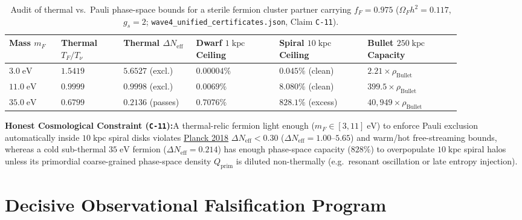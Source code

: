 \documentclass[11pt,letterpaper]{article}
\newcommand{\cautionbox}[2]{%
  \vspace{5pt}\noindent\colorbox{warnbg}{%
    \parbox{\dimexpr\linewidth-2\fboxsep\relax}{%
      \vspace{3pt}\textbf{\color{accent}#1:}\hspace{0.45em}#2\vspace{3pt}%
    }%
  }\vspace{5pt}%
}
\begin{document}
\begin{table}[!htbp]
\centering
\caption{Audit of thermal vs.\ Pauli phase-space bounds for a sterile fermion cluster partner carrying $f_F = 0.975$ ($\Omega_F h^2 = 0.117$, $g_s = 2$; \texttt{wave4\_unified\_certificates.json}, Claim \texttt{C-11}).}
\label{tab:fermion}
\footnotesize
\begin{tabular}{@{}p{0.10\linewidth}p{0.12\linewidth}p{0.14\linewidth}p{0.16\linewidth}p{0.17\linewidth}p{0.18\linewidth}@{}}
\toprule
\textbf{Mass $m_F$} & \textbf{Thermal $T_F/T_\nu$} & \textbf{Thermal $\Delta N_{\mathrm{eff}}$} & \textbf{Dwarf $1\;\mathrm{kpc}$ Ceiling} & \textbf{Spiral $10\;\mathrm{kpc}$ Ceiling} & \textbf{Bullet $250\;\mathrm{kpc}$ Capacity} \\
\midrule
$3.0\;\mathrm{eV}$ & $1.5419$ & $5.6527$ (excl.) & $0.00004\%$ & $0.045\%$ (clean) & $2.21\times \rho_{\mathrm{Bullet}}$ \\
$11.0\;\mathrm{eV}$ & $0.9999$ & $0.9998$ (excl.) & $0.0069\%$ & $8.080\%$ (clean) & $399.5\times \rho_{\mathrm{Bullet}}$ \\
$35.0\;\mathrm{eV}$ & $0.6799$ & $0.2136$ (passes) & $0.7076\%$ & $828.1\%$ (excess) & $40{,}949\times \rho_{\mathrm{Bullet}}$ \\
\bottomrule
\end{tabular}
\end{table}

\cautionbox{Honest Cosmological Constraint (\texttt{C-11})}{A thermal-relic fermion light enough ($m_F \in [3, 11]\;\mathrm{eV}$) to enforce Pauli exclusion automatically inside $10\;\mathrm{kpc}$ spiral disks violates \href{https://arxiv.org/abs/1807.06209}{Planck 2018} $\Delta N_{\mathrm{eff}} < 0.30$ ($\Delta N_{\mathrm{eff}} = 1.00\text{--}5.65$) and warm/hot free-streaming bounds, whereas a cold sub-thermal $35\;\mathrm{eV}$ fermion ($\Delta N_{\mathrm{eff}} = 0.214$) has enough phase-space capacity ($828\%$) to overpopulate $10\;\mathrm{kpc}$ spiral halos unless its primordial coarse-grained phase-space density $Q_{\mathrm{prim}}$ is diluted non-thermally (e.g.\ resonant oscillation or late entropy injection).}

\section{Decisive Observational Falsification Program}
\end{document}
